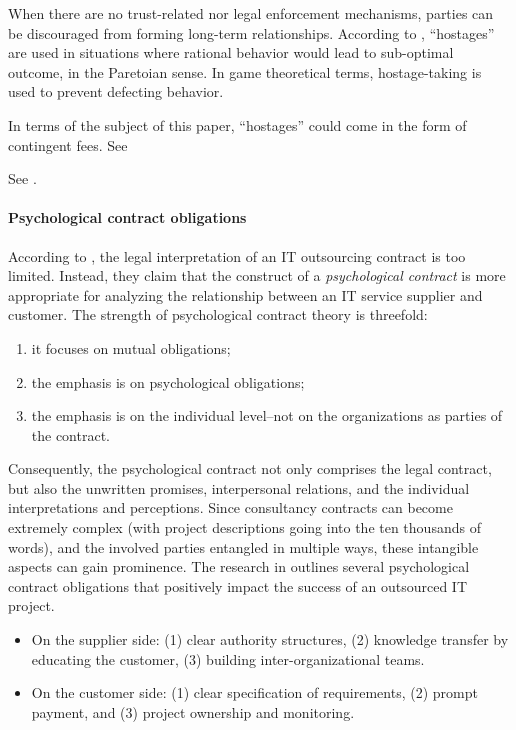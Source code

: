 \documentclass[12pt]{article}
\providecommand{\tightlist}{%
  \setlength{\itemsep}{0pt}\setlength{\parskip}{0pt}}
\begin{document}
When there are no trust-related nor legal enforcement mechanisms,
parties can be discouraged from forming long-term relationships.
According to \citet[47-48]{werner1993}, ``hostages'' are used in
situations where rational behavior would lead to sub-optimal outcome, in
the Paretoian sense. In game theoretical terms, hostage-taking is used
to prevent defecting behavior.

In terms of the subject of this paper, ``hostages'' could come in the
form of contingent fees. See \citep[ 243]{clark1993}

See \citet{tosi1997}.

\hypertarget{psychological-contract-obligations}{%
\paragraph{Psychological contract
obligations}\label{psychological-contract-obligations}}

According to \citet[357]{ang2004}, the legal interpretation of an IT
outsourcing contract is too limited. Instead, they claim that the
construct of a \emph{psychological contract} is more appropriate for
analyzing the relationship between an IT service supplier and customer.
The strength of psychological contract theory is threefold:

\begin{enumerate}
\def\labelenumi{\arabic{enumi}.}
\tightlist
\item
  it focuses on mutual obligations;
\item
  the emphasis is on psychological obligations;
\item
  the emphasis is on the individual level--not on the organizations as
  parties of the contract.
\end{enumerate}

Consequently, the psychological contract not only comprises the legal
contract, but also the unwritten promises, interpersonal relations, and
the individual interpretations and perceptions. Since consultancy
contracts can become extremely complex (with project descriptions going
into the ten thousands of words), and the involved parties entangled in
multiple ways, these intangible aspects can gain prominence. The
research in \citet[369-70]{ang2004} outlines several psychological
contract obligations that positively impact the success of an outsourced
IT project.

\begin{itemize}
\tightlist
\item
  On the supplier side: (1) clear authority structures, (2) knowledge
  transfer by educating the customer, (3) building inter-organizational
  teams.
\item
  On the customer side: (1) clear specification of requirements, (2)
  prompt payment, and (3) project ownership and monitoring.
\end{itemize}
\end{document}
